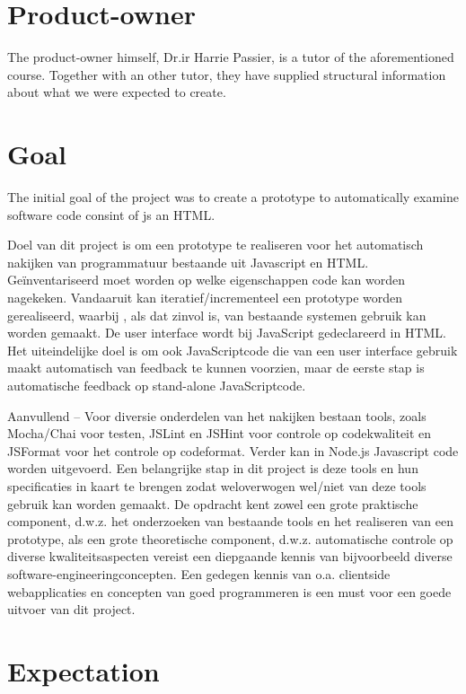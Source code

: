\section{Product-owner}

The product-owner himself, Dr.ir Harrie Passier, is a tutor of the aforementioned course.
Together with an other tutor, they have supplied structural information about
what we were expected to create.


\section{Goal}
The initial goal of the project was to create a prototype to automatically examine
software code consint of \gls{js} an HTML.

Doel van dit project is om een prototype te realiseren voor het automatisch nakijken van programmatuur bestaande uit Javascript en HTML. Geïnventariseerd moet worden op welke eigenschappen code kan worden nagekeken. Vandaaruit kan iteratief/incrementeel een prototype worden gerealiseerd, waarbij , als dat zinvol is, van bestaande systemen gebruik kan worden gemaakt.
De user interface wordt bij JavaScript gedeclareerd in HTML. Het uiteindelijke doel is om ook JavaScriptcode die van een user interface gebruik maakt automatisch van feedback te kunnen voorzien, maar de eerste stap is automatische feedback op stand-alone JavaScriptcode.

Aanvullend – Voor diversie onderdelen van het nakijken bestaan tools, zoals Mocha/Chai voor testen, JSLint en JSHint voor controle op codekwaliteit en JSFormat voor het controle op codeformat. Verder kan in Node.js Javascript code worden uitgevoerd. Een belangrijke stap in dit project is deze tools en hun specificaties in kaart te brengen zodat weloverwogen wel/niet van deze tools gebruik kan worden gemaakt.
De opdracht kent zowel een grote praktische component, d.w.z. het onderzoeken van bestaande tools en het realiseren van een prototype, als een grote theoretische component, d.w.z. automatische controle op diverse kwaliteitsaspecten vereist een diepgaande kennis van bijvoorbeeld diverse software-engineeringconcepten.
Een gedegen kennis van o.a. clientside webapplicaties en concepten van goed programmeren is een must voor een goede uitvoer van dit project.

\section{Expectation}

